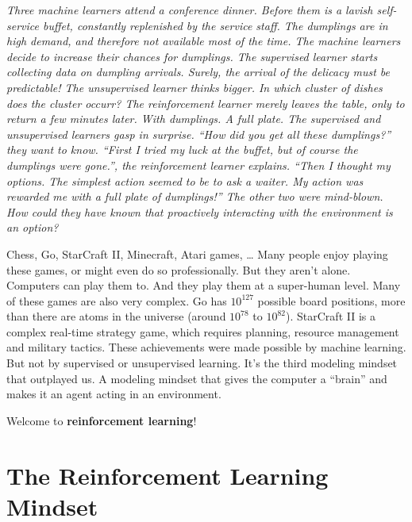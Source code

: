 \documentclass[
  10pt,
]{scrbook}
\begin{document}
\emph{Three machine learners attend a conference dinner.
Before them is a lavish self-service buffet, constantly replenished by the service staff.
The dumplings are in high demand, and therefore not available most of the time.
The machine learners decide to increase their chances for dumplings.
The supervised learner starts collecting data on dumpling arrivals.
Surely, the arrival of the delicacy must be predictable!
The unsupervised learner thinks bigger.
In which cluster of dishes does the cluster occurr?
The reinforcement learner merely leaves the table, only to return a few minutes later.
With dumplings. A full plate.
The supervised and unsupervised learners gasp in surprise.
``How did you get all these dumplings?'' they want to know.
``First I tried my luck at the buffet, but of course the dumplings were gone.'', the reinforcement learner explains.
``Then I thought my options.
The simplest action seemed to be to ask a waiter.
My action was rewarded me with a full plate of dumplings!''
The other two were mind-blown.
How could they have known that proactively interacting with the environment is an option?}

Chess, Go, StarCraft II, Minecraft, Atari games, \ldots{}
Many people enjoy playing these games, or might even do so professionally.
But they aren't alone.
Computers can play them to.
And they play them at a super-human level.
Many of these games are also very complex.
Go has \(10^{127}\) possible board positions, more than there are atoms in the universe (around \(10^{78}\) to \(10^{82}\)).
StarCraft II is a complex real-time strategy game, which requires planning, resource management and military tactics.
These achievements were made possible by machine learning.
But not by supervised or unsupervised learning.
It's the third modeling mindset that outplayed us.
A modeling mindset that gives the computer a ``brain'' and makes it an agent acting in an environment.

Welcome to \textbf{reinforcement learning}!

\hypertarget{the-reinforcement-learning-mindset}{%
\section{The Reinforcement Learning Mindset}\label{the-reinforcement-learning-mindset}}
\end{document}

